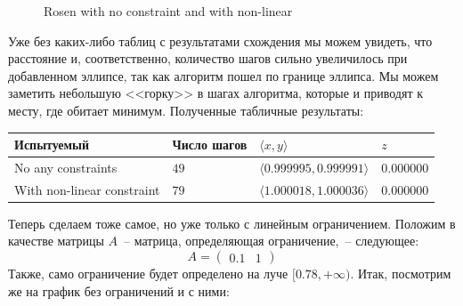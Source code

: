 \documentclass[12pt, a4paper, oneside, final]{article}
\begin{document}
\begin{figure}[H]
		\caption*{Rosen with no constraint and with non-linear}
	\end{figure}
	Уже без каких-либо таблиц с результатами схождения мы можем увидеть, что расстояние и, соответственно, количество шагов сильно увеличилось при добавленном эллипсе, так как алгоритм пошел по границе эллипса.
	Мы можем заметить небольшую <<горку>> в шагах алгоритма, которые и приводят к месту, где обитает минимум.
	Полученные табличные результаты:
	\begin{table}[H]
		\centering
		\begin{tabular}{l|l|l|l}
			Испытуемый & Число шагов & $\langle x, y \rangle$ & $z$ \\ \hline
			No any constraints & $49$ & $\langle 0.999995,   0.999991 \rangle$ & $0.000000$ \\
			With non-linear constraint & $79$ & $\langle 1.000018,   1.000036 \rangle$ & $0.000000$
		\end{tabular}
	\end{table}
	Теперь сделаем тоже самое, но уже только с линейным ограничением.
	Положим в качестве матрицы $A$~-- матрица, определяющая ограничение,~-- следующее:
	\[
		A =
		\begin{pmatrix}
			0.1 & 1
		\end{pmatrix}
	\]
	Также, само ограничение будет определено на луче $[0.78, +\infty)$.
	Итак, посмотрим же на график без ограничений и с ними:
\end{document}
